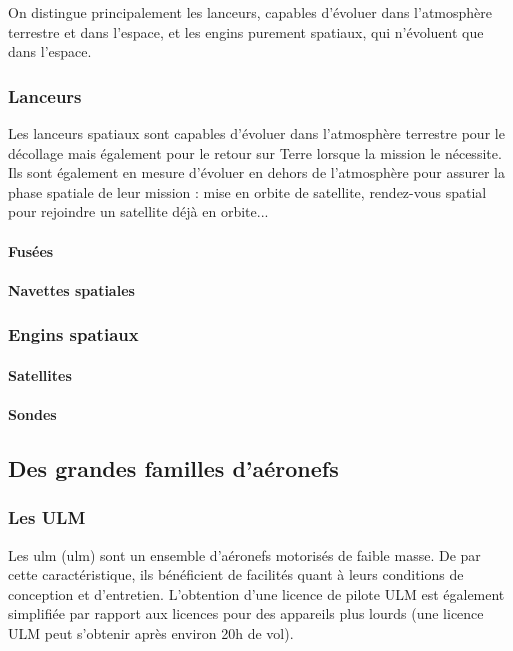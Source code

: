	On distingue principalement les lanceurs, capables d'évoluer dans l'atmosphère terrestre et dans l'espace, et les engins purement spatiaux, qui n'évoluent que dans l'espace.

	\subsubsection{Lanceurs}
	Les lanceurs spatiaux sont capables d'évoluer dans l'atmosphère terrestre pour le décollage mais également pour le retour sur Terre lorsque la mission le nécessite. Ils sont également en mesure d'évoluer en dehors de l'atmosphère pour assurer la phase spatiale de leur mission : mise en orbite de satellite, rendez-vous spatial pour rejoindre un satellite déjà en orbite...
	
		\paragraph{Fusées}
		\paragraph{Navettes spatiales}
		
	\subsubsection{Engins spatiaux}
		\paragraph{Satellites}
		\paragraph{Sondes}

\subsection{Des grandes familles d'aéronefs}		
\subsubsection{Les ULM}

Les \acrshort{ulm} (\acrlong{ulm})  sont un ensemble d'aéronefs motorisés de faible masse. De par cette caractéristique, ils bénéficient de facilités quant à leurs conditions de conception et d'entretien. L'obtention d'une licence de pilote ULM est également simplifiée par rapport aux licences pour des appareils plus lourds (une licence ULM peut s'obtenir après environ 20h de vol). \\

